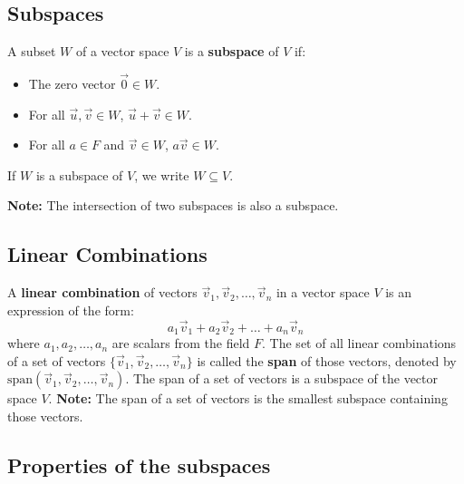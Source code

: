 \subsection{Subspaces}

A subset $W$ of a vector space $V$ is a \textbf{subspace} of $V$ if:
\begin{itemize}[label=$-$]

	\item The zero vector $\vec{0} \in W$.
	\item For all $\vec{u}, \vec{v} \in W$, $\vec{u} + \vec{v} \in W$.
	\item For all $a \in F$ and $\vec{v} \in W$, $a\vec{v} \in W$.
\end{itemize}
If $W$ is a subspace of $V$, we write $W \subseteq V$.

\textbf{Note:} The intersection of two subspaces is also a subspace.

\subsection{Linear Combinations}

A \textbf{linear combination} of vectors $\vec{v}_1, \vec{v}_2, \ldots, \vec{v}_n$ in a vector space $V$ is an expression of
the form:
\[
	a_1\vec{v}_1 + a_2\vec{v}_2 + \ldots + a_n\vec{v}_n
\]
where $a_1, a_2, \ldots, a_n$ are scalars from the field $F$.
The set of all linear combinations of a set of vectors $\{\vec{v}_1, \vec{v}_2, \ldots, \vec{v}_n\}$ is called the \textbf{span} of those vectors,
denoted by $\text{span}(\vec{v}_1, \vec{v}_2, \ldots, \vec{v}_n)$.
The span of a set of vectors is a subspace of the vector space $V$.
\textbf{Note:} The span of a set of vectors is the smallest subspace containing those vectors.

\subsection{Properties of the subspaces}


